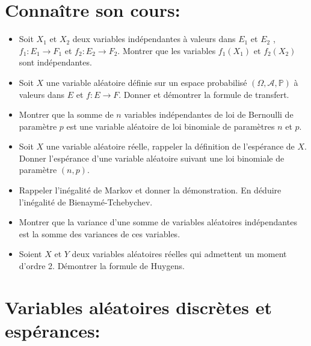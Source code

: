 \documentclass[a4paper,11pt]{article}
\theoremstyle{definition}
\begin{document}
 
 

\noindent{}

\smallskip
\section*{Connaître son cours:}
\begin{itemize}[$\bullet$]
	\item Soit $X_1$ et $X_2$ deux variables indépendantes à valeurs dans $E_1$ et $E_2$ , $f_1 : E_1 \to F_1$ et $f_2 : E_2 \to F_2 $. Montrer que les variables $f_1 (X_1 )$ et $f_2 (X_2 )$ sont indépendantes.
	\item Soit $X$ une variable aléatoire définie sur un espace probabilisé $(\Omega,\mathcal{A},\mathbb{P})$ à valeurs dans $E$ et $f : E \to F$. Donner et démontrer la formule de transfert.
	\item Montrer que la somme de $n$ variables indépendantes de loi de Bernoulli de paramètre $p$ est une variable aléatoire de loi binomiale de paramètres $n$ et $p $.
	\item Soit $X$ une variable aléatoire réelle, rappeler la définition de l'espérance de $X$. Donner l'espérance d'une variable aléatoire suivant une loi binomiale de paramètre $(n,p)$. 
	\item Rappeler l'inégalité de Markov et donner la démonstration. En déduire l'inégalité de Bienaymé-Tchebychev.
	\item Montrer que la variance d'une somme de variables aléatoires indépendantes est la somme des variances de ces variables.
	\item Soient $X$ et $Y$ deux variables aléatoires réelles qui admettent un moment d'ordre 2. Démontrer la formule de Huygens.

\end{itemize}
\raggedright

\section*{Variables aléatoires discrètes et espérances:}\hfill\\%
\end{document}
